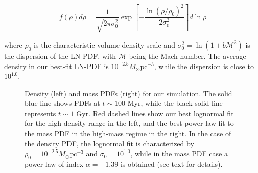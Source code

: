 \documentclass[twocolumn]{aastex}
\newcommand{\msun}{M_\odot}
\newcommand{\rhoo}{\rho_0}
\begin{document}
	\begin{equation}
	f(\rho)d\rho=\frac{1}{\sqrt{2\pi\sigma_0^2}}\exp{\left[ -\frac{\ln{(\rho/\rhoo)}^2}{2\sigma_0^2} \right]}d\ln{\rho}
	\end{equation}

\noindent where $\rhoo$ is the characteristic volume density scale and $\sigma_0^2=\ln{(1+b\mathcal{M}^2)}$ is the dispersion of the LN-PDF, with $\mathcal{M}$ being the Mach number. The average density in our best-fit LN-PDF is $10^{-2.5} \msun \text{pc}^{-3}$, while the dispersion is close to $10^{1.0}$.

	\begin{figure}[h]
		\centering
		\caption{Density (left) and mass PDFs (right) for our simulation. The solid blue line shows PDFs at $t \sim 100$ Myr, while the black solid line represents $t \sim 1$ Gyr. Red dashed lines show our best lognormal fit for the high-density range in the left, and the best power law fit to the mass PDF in the high-mass regime in the right. In the case of the density PDF, the lognormal fit is characterized by $\rhoo = 10^{-2.5}\msun \text{pc}^{-3}$ and $\sigma_0 = 10^{1.0}$, while in the mass PDF case a power law of index $\alpha = -1.39$ is obtained (see text for details).}\label{fig:pdfs}
	\end{figure}
\end{document}
